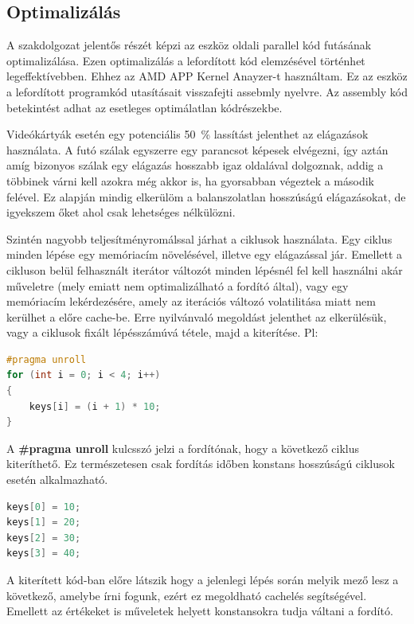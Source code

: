 \subsection{Optimalizálás}

A szakdolgozat jelentős részét képzi az eszköz oldali parallel kód futásának optimalizálása. Ezen optimalizálás a lefordított kód elemzésével történhet legeffektívebben. Ehhez az AMD APP Kernel Anayzer-t használtam. Ez az eszköz a lefordított programkód utasításait visszafejti assebmly nyelvre. Az assembly kód betekintést adhat az esetleges optimálatlan kódrészekbe. 

Videókártyák esetén egy potenciális \SI{50}{\percent} lassítást jelenthet az elágazások használata. A futó szálak egyszerre egy parancsot képesek elvégezni, így aztán amíg bizonyos szálak egy elágazás hosszabb igaz oldalával dolgoznak, addig a többinek várni kell azokra még akkor is, ha gyorsabban végeztek a második felével. Ez alapján mindig elkerülöm a balanszolatlan hosszúságú elágazásokat, de igyekszem őket ahol csak lehetséges nélkülözni.

Szintén nagyobb teljesítményromálssal járhat a ciklusok használata. Egy ciklus minden lépése egy memóriacím növelésével, illetve egy elágazással jár. Emellett a cikluson belül felhasznált iterátor változót minden lépésnél fel kell használni akár műveletre (mely emiatt nem optimalizálható a fordító által), vagy egy memóriacím lekérdezésére, amely az iterációs változó volatilitása miatt nem kerülhet a előre cache-be. Erre nyilvánvaló megoldást jelenthet az elkerülésük, vagy a ciklusok fixált lépésszámúvá tétele, majd a kiterítése. Pl:


\begin{lstlisting}[language={C++}]
#pragma unroll
for (int i = 0; i < 4; i++)
{
    keys[i] = (i + 1) * 10;
}
\end{lstlisting}


A \textbf{\#pragma unroll} kulcsszó jelzi a fordítónak, hogy a következő ciklus kiteríthető. Ez természetesen csak fordítás időben konstans hosszúságú ciklusok esetén alkalmazható.


\begin{lstlisting}[language={C++}]
keys[0] = 10;
keys[1] = 20;
keys[2] = 30;
keys[3] = 40;
\end{lstlisting}


A kiterített kód-ban előre látszik hogy a jelenlegi lépés során melyik mező lesz a következő, amelybe írni fogunk, ezért ez megoldható cachelés segítségével. Emellett az értékeket is műveletek helyett konstansokra tudja váltani a fordító.










